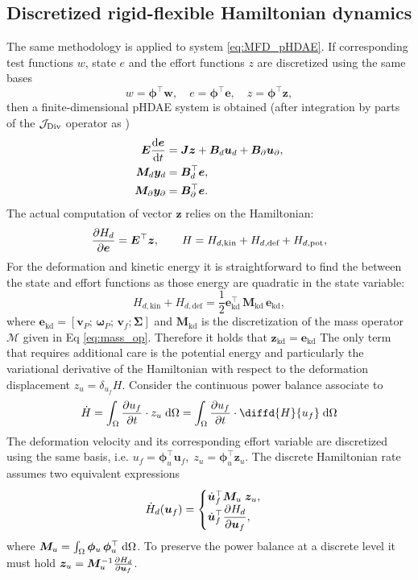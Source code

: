 \subsection{Discretized rigid-flexible Hamiltonian dynamics}

The same methodology is applied to system \eqref{eq:MFD_pHDAE}. If corresponding test functions $w$, state $e$ and the effort functions $z$ are discretized using the same bases
\[ w = \bm{\phi}^\top \bm{w}, \quad e = \bm{\phi}^\top \bm{e}, \quad z = \bm{\phi}^\top \bm{z},
\]
then a finite-dimensional pHDAE system is obtained (after integration by parts of the $\mathcal{J}_{\operatorname*{Div}}$ operator as )
\begin{equation}
	\begin{aligned}
	\bm{E} \diff{\bm{e}}{t} &= \bm{J z} + \bm{B}_d \bm{u}_d + \bm{B}_\partial \bm{u}_\partial, \\
	\bm{M}_d \bm{y}_d &= \bm{B}_d^\top \bm{e},  \\
	\bm{M}_\partial \bm{y}_\partial &= \bm{B}_\partial^\top \bm{e}.
	\end{aligned}
\end{equation}
The actual computation of vector $\bm{z}$ relies on the Hamiltonian:
\[
\diffp{H_d}{\bm{e}} = \bm{E}^\top \bm{z}, \qquad H = H_{d, \text{kin}}+H_{d, \text{def}}+H_{d, \text{pot}},
\]
For the deformation and kinetic energy it is straightforward to find the between the state and effort functions as those energy are quadratic in the state variable:
\begin{equation}
H_{d, \text{kin}} + H_{d, \text{def}} = \frac{1}{2} \bm{e}_{\text{kd}}^\top \, \bm{M}_{\text{kd}} \, \bm{e}_{\text{kd}},
\end{equation}
where $\bm{e}_{\text{kd}} = [\bm{v}_P; \, \bm{\omega}_P; \, \bm{v}_f; \bm{\Sigma}]$ and $\bm{M}_{\text{kd}}$ is the discretization of the mass operator $\mathcal{M}$ given in Eq \eqref{eq:mass_op}. Therefore it holds that $\bm{z}_{\text{kd}} = \bm{e}_{\text{kd}}$
The only term that requires additional care is the potential energy and particularly the variational derivative of the Hamiltonian with respect to the deformation displacement $z_{u}=\delta_{u_f} H$.  Consider the continuous power balance associate to
\[
\dot{H} = \int_{\Omega} \diffp{u_f}{t} \cdot z_{u} \d{\Omega} = \int_{\Omega} \diffp{u_f}{t} \cdot \diffd{H}{u_f} \d{\Omega}
\]
The deformation velocity and its corresponding effort variable are discretized using the same basis, i.e. $u_f = \bm{\phi}_u^\top \bm{u}_f, \; z_u = \bm{\phi}_u^\top \bm{z}_u$. The discrete Hamiltonian rate assumes two equivalent expressions
\begin{equation*}
\dot{H}_d(\bm{u}_f) = 
\begin{cases}
\dot{\bm{u}}_f^\top \bm{M}_u \; \bm{z}_u, \\
\displaystyle \dot{\bm{u}}_f^\top \diffp{H_d}{\bm{u}_f},
\end{cases}
\end{equation*}
where $\bm{M}_u=\int_{\Omega} \bm{\phi}_u \, \bm{\phi}_u^\top \d{\Omega}$. To preserve the power balance at a discrete level it must hold $ \bm{z}_u = \bm{M}_u^{-1} \diffp{H_d}{\bm{u}_f}$. \\

